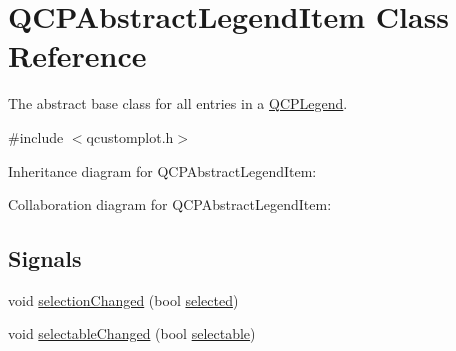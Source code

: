 \hypertarget{class_q_c_p_abstract_legend_item}{}\section{Q\+C\+P\+Abstract\+Legend\+Item Class Reference}
\label{class_q_c_p_abstract_legend_item}


The abstract base class for all entries in a \hyperlink{class_q_c_p_legend}{Q\+C\+P\+Legend}.  




{\ttfamily \#include $<$qcustomplot.\+h$>$}



Inheritance diagram for Q\+C\+P\+Abstract\+Legend\+Item\+:


Collaboration diagram for Q\+C\+P\+Abstract\+Legend\+Item\+:
\subsection*{Signals}
\begin{DoxyCompactItemize}
\item 
void \hyperlink{class_q_c_p_abstract_legend_item_a7cb61fdfbaf69c590bacb8f9e7099d9e}{selection\+Changed} (bool \hyperlink{class_q_c_p_abstract_legend_item_adf427dbb05d5f1a8e84c6abcb05becdf}{selected})
\item 
void \hyperlink{class_q_c_p_abstract_legend_item_abc4d779b938cc9235f9196737dbaa6bd}{selectable\+Changed} (bool \hyperlink{class_q_c_p_abstract_legend_item_af054a668038bcd7e35a35a07d1e79a23}{selectable})
\end{DoxyCompactItemize}
